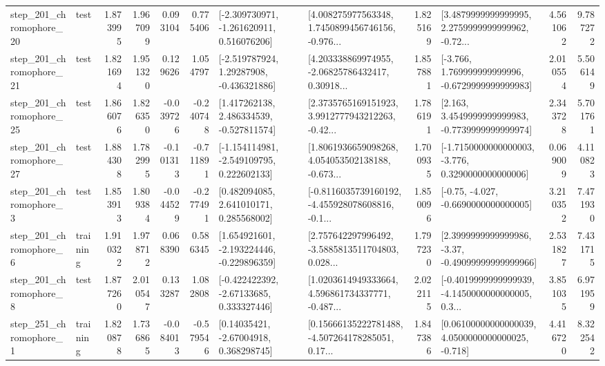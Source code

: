 \begin{tabular}{llrrrrllrlrr}
  step\_201\_chromophore\_20 &      test &      1.873995 &    1.967099 &      0.093104 &  0.775406 &   [-2.309730971, -1.261620911, 0.516076206] &  [4.008275977563348, 1.7450899456746156, -0.976... &       1.825169 &  [3.4879999999999995, 2.2759999999999962, -0.72... &            4.561062 &          9.787272 \\
  step\_201\_chromophore\_21 &      test &      1.821694 &    1.951320 &      0.129626 &  1.054797 &    [-2.519787924, 1.29287908, -0.436321886] &  [4.203338869974955, -2.06825786432417, 0.30918... &       1.857881 &   [-3.766, 1.769999999999996, -0.6729999999999983] &            2.010554 &          5.506149 \\
  step\_201\_chromophore\_25 &      test &      1.866076 &    1.826350 &     -0.039726 & -0.240748 &    [1.417262138, 2.486334539, -0.527811574] &  [2.3735765169151923, 3.9912777943212263, -0.42... &       1.786191 &   [2.163, 3.4549999999999983, -0.7739999999999974] &            2.343728 &          5.701761 \\
  step\_201\_chromophore\_27 &      test &      1.884308 &    1.782995 &     -0.101313 & -0.711891 &   [-1.154114981, -2.549109795, 0.222602133] &  [1.8061936659098268, 4.054053502138188, -0.673... &       1.700935 &  [-1.7150000000000003, -3.776, 0.3290000000000006] &            0.069009 &          4.110823 \\
   step\_201\_chromophore\_3 &      test &      1.853913 &    1.809384 &     -0.044529 & -0.277491 &     [0.482094085, 2.641010171, 0.285568002] &  [-0.8116035739160192, -4.455928078608816, -0.1... &       1.850096 &               [-0.75, -4.027, -0.6690000000000005] &            3.210352 &          7.471930 \\
   step\_201\_chromophore\_6 &  training &      1.910322 &    1.978712 &      0.068390 &  0.586345 &   [1.654921601, -2.193224446, -0.229896359] &  [2.757642297996492, -3.5885813511704803, 0.028... &       1.797230 &  [2.3999999999999986, -3.37, -0.49099999999999966] &            2.531827 &          7.431715 \\
   step\_201\_chromophore\_8 &      test &      1.877260 &    2.010547 &      0.133287 &  1.082808 &    [-0.422422392, -2.67133685, 0.333327446] &  [1.0203614949333664, 4.596861734337771, -0.487... &       2.022115 &  [-0.4019999999999939, -4.1450000000000005, 0.3... &            3.851035 &          6.971959 \\
   step\_251\_chromophore\_1 &  training &      1.820878 &    1.736865 &     -0.084013 & -0.579546 &      [0.14035421, -2.67004918, 0.368298745] &  [0.15666135222781488, -4.507264178285051, 0.17... &       1.847386 &  [0.06100000000000039, 4.0500000000000025, -0.718] &            4.416720 &          8.322542 \\

\end{tabular}
